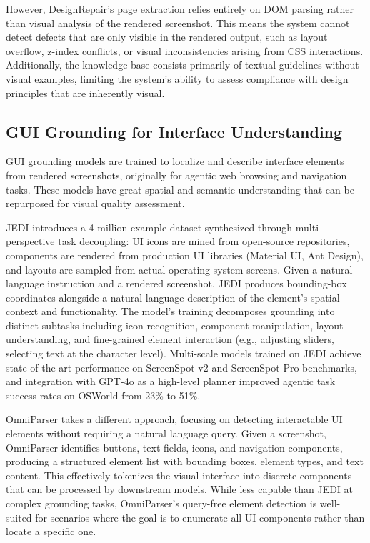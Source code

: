 \documentclass[11pt]{article}
\begin{document}
However, DesignRepair's page extraction relies entirely on DOM parsing rather than visual analysis of the rendered screenshot. This means the system cannot detect defects that are only visible in the rendered output, such as layout overflow, z-index conflicts, or visual inconsistencies arising from CSS interactions. Additionally, the knowledge base consists primarily of textual guidelines without visual examples, limiting the system's ability to assess compliance with design principles that are inherently visual.

\subsection{GUI Grounding for Interface Understanding}

GUI grounding models are trained to localize and describe interface elements from rendered screenshots, originally for agentic web browsing and navigation tasks. These models have great spatial and semantic understanding that can be repurposed for visual quality assessment.

JEDI \cite{jedi2025} introduces a 4-million-example dataset synthesized through multi-perspective task decoupling: UI icons are mined from open-source repositories, components are rendered from production UI libraries (Material UI, Ant Design), and layouts are sampled from actual operating system screens. Given a natural language instruction and a rendered screenshot, JEDI produces bounding-box coordinates alongside a natural language description of the element's spatial context and functionality. The model's training decomposes grounding into distinct subtasks including icon recognition, component manipulation, layout understanding, and fine-grained element interaction (e.g., adjusting sliders, selecting text at the character level). Multi-scale models trained on JEDI achieve state-of-the-art performance on ScreenSpot-v2 and ScreenSpot-Pro benchmarks, and integration with GPT-4o as a high-level planner improved agentic task success rates on OSWorld from 23\% to 51\%.

OmniParser \cite{omniparser2025} takes a different approach, focusing on detecting interactable UI elements without requiring a natural language query. Given a screenshot, OmniParser identifies buttons, text fields, icons, and navigation components, producing a structured element list with bounding boxes, element types, and text content. This effectively tokenizes the visual interface into discrete components that can be processed by downstream models. While less capable than JEDI at complex grounding tasks, OmniParser's query-free element detection is well-suited for scenarios where the goal is to enumerate all UI components rather than locate a specific one.
\end{document}
